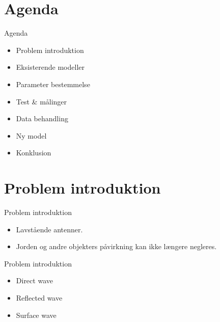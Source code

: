 \section{Agenda}
\begin{frame}{Agenda}
\begin{itemize}
\item Problem introduktion
\item Eksisterende modeller
\item Parameter bestemmelse
\item Test \& målinger
\item Data behandling
\item Ny model
\item Konklusion
\end{itemize}
\end{frame}
\section{Problem introduktion}
\begin{frame}{Problem introduktion}
\begin{minipage}{0.5\textwidth}

\begin{itemize}
\item Lavstående antenner.
\item Jorden og andre objekters påvirkning kan ikke længere negleres.
\end{itemize}

\end{minipage}
\begin{minipage}{0.45\textwidth}


\end{minipage}
\end{frame}

\begin{frame}{Problem introduktion}
\begin{minipage}{0.5\textwidth}

\begin{itemize}
\item Direct wave
\item Reflected wave
\item Surface wave
\end{itemize}

\end{minipage}
\begin{minipage}{0.45\textwidth}


\end{minipage}
\end{frame}

